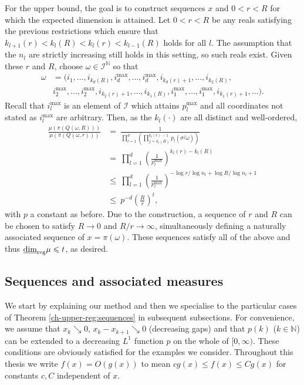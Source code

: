 For the upper bound, the goal is to construct sequences $x$ and $0 < r < R$ for which the expected dimension is attained. Let $0<r<R$ be any reals satisfying the previous restrictions which ensure that $ k_{l+1}(r)< k_l(R) < k_l(r) < k_{l-1}(R)$ holds for all $l$. The assumption that the $n_l$ are strictly increasing still holds in this setting, so such reals exist. Given these $r$ and $R$, choose $\omega \in \mathcal{I}^\mathbb{N}$ so that 
\begin{align*} 
\omega&= (i_1,\ldots, i_{k_d(R)}, i_d^{\text{max}},\ldots, i_d^{\text{max}}, i_{k_d(r)+1},\ldots, i_{k_2(R)},\\
&i_2^{\text{max}},\ldots , i_2^{\text{max}}, i_{k_2(r)+1},\ldots, i_{k_1(R)}, i_1^{\text{max}}, \ldots, i_1^{\text{max}}, i_{k_1(r)+1},\ldots).
\end{align*}
Recall that $i_l^{\text{max}}$ is an element of $\mathcal{I}$ which attains $p_l^{\text{max}}$ and all coordinates not stated as $i_l^{\text{max}}$ are arbitrary. Then, as the $k_l(\cdot)$ are all distinct and well-ordered,
\begin{align*}
\frac{\mu(\pi(Q(\omega,R)))}{\mu(\pi(Q(\omega,r)))}  & =\ \frac{1}{\prod_{l=1}^d\left(\prod_{j=k_l(R)}^{k_l(r)-1}p_l(\sigma^j \omega) \right)} \\
& = \ \prod_{l=1}^d\left( \frac{1}{p_l^{\text{max}}}\right)^{k_l(r)-k_l(R)}  \\
& \le\ \prod_{l=1}^d \left( \frac{1}{p_l^{\text{max}}}\right)^{-\log r/\log n_l + \log R/\log n_l + 1}  \\
& \le \ p^{-d} \left( \frac{R}{r} \right)^{t},
\end{align*}
with $p$ a constant as before. Due to the construction, a sequence of $r$ and $R$ can be chosen to satisfy $R \rightarrow 0$ and $R/r \rightarrow \infty$, simultaneously defining a naturally associated sequence of $x = \pi(\omega)$. These sequences satisfy all of the above and thus $\underline{\dim}_{\textup{reg}} \mu \leqslant t$, as desired.




\subsection{Sequences and associated measures}\label{ch-upper-reg:sequenceproof}



We start by explaining our method and then we specialise to the particular cases of  Theorem \ref{ch-upper-reg:sequences} in subsequent subsections.  For convenience, we assume that $x_k \searrow 0$, $x_k-x_{k+1} \searrow 0$ (decreasing gaps) and that $p(k)$ ($k \in \mathbb{N}$) can be extended to a decreasing $L^1$ function $p$ on the whole of $[0,\infty)$. These conditions are obviously satisfied for the  examples we consider.  Throughout this thesis we write $f(x)=O(g(x))$ to mean $cg(x) \le f(x) \le Cg(x)$ for constants $c,C$ independent of $x$.

